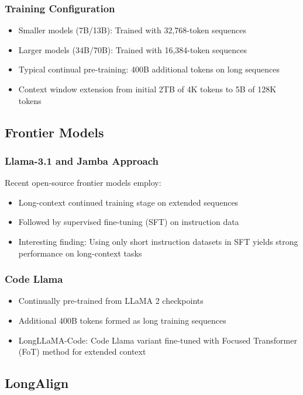 \documentclass[11pt,letterpaper]{article}
\begin{document}
\subsubsection{Training Configuration}
\begin{itemize}[leftmargin=*]
    \item Smaller models (7B/13B): Trained with 32,768-token sequences
    \item Larger models (34B/70B): Trained with 16,384-token sequences
    \item Typical continual pre-training: 400B additional tokens on long sequences
    \item Context window extension from initial 2TB of 4K tokens to 5B of 128K tokens
\end{itemize}

\subsection{Frontier Models}

\subsubsection{Llama-3.1 and Jamba Approach}
Recent open-source frontier models employ:
\begin{itemize}[leftmargin=*]
    \item Long-context continued training stage on extended sequences
    \item Followed by supervised fine-tuning (SFT) on instruction data
    \item Interesting finding: Using only short instruction datasets in SFT yields strong performance on long-context tasks
\end{itemize}

\subsubsection{Code Llama}
\begin{itemize}[leftmargin=*]
    \item Continually pre-trained from LLaMA 2 checkpoints
    \item Additional 400B tokens formed as long training sequences
    \item LongLLaMA-Code: Code Llama variant fine-tuned with Focused Transformer (FoT) method for extended context
\end{itemize}

\subsection{LongAlign}
\end{document}
